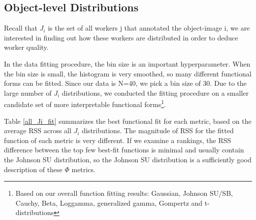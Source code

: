 \documentclass[12pt]{article}
\begin{document}
\subsection{Object-level Distributions}
\par Recall that $J_i$  is the set of all workers j that annotated the object-image i, we are interested in finding out how these workers are distributed in order to deduce worker quality. 
\par In the data fitting procedure, the bin size is an important hyperparameter. When the bin size is small, the histogram is very smoothed, so many different functional forms can be fitted. Since our data is N=40, we pick a bin size of 30. Due to the large number of $J_i$ distributions, we conducted the fitting procedure on a smaller candidate set of more interpretable functional forms\footnote{Based on our overall function fitting results: Gaussian, Johnson SU/SB, Cauchy, Beta, Loggamma, generalized gamma, Gompertz and t-distributions}.
\par  Table \ref{all_Ji_fit} summarizes the best functional fit for each metric, based on the average RSS across all $J_i$ distributions. The magnitude of RSS for the fitted function of each metric is very different. If we examine a rankings, the RSS difference between the top few best-fit functions is minimal and usually contain the Johnson SU distribution, so the Johnson SU distribution is a sufficiently good description of these $\Phi$ metrics. 
\end{document}
